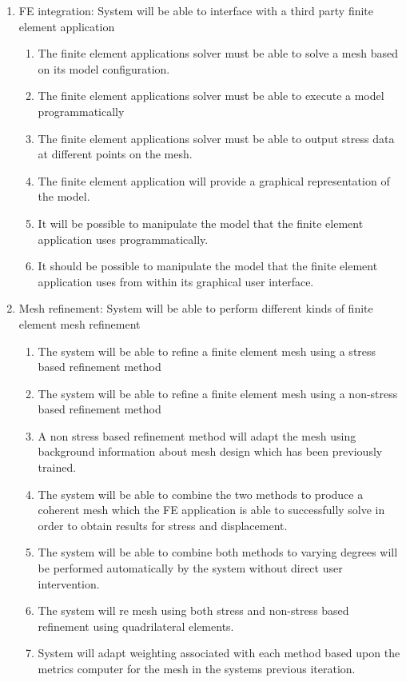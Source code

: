 \documentclass{article}
\begin{document}
\begin{enumerate}
\item FE integration: System will be able to interface with a third party finite element application

\begin{enumerate}
\item The finite element applications solver must be able to solve a mesh based on its model configuration.
\item The finite element applications solver must be able to execute a model programmatically
\item The finite element applications solver must be able to output stress data at different points on the mesh.
\item The finite element application will provide a graphical representation of the model.
\item It will be possible to manipulate the model that the finite element application uses programmatically.
\item It should be possible to manipulate the model that the finite element application uses from within its graphical user interface.
\end{enumerate}

\item Mesh refinement: System will be able to perform different kinds of finite element mesh refinement

\begin{enumerate}
\item The system will be able to refine a finite element mesh using a stress based refinement method
\item The system will be able to refine a finite element mesh using a non-stress based refinement method

\item A non stress based refinement method will adapt the mesh using background information about mesh design which has been previously trained.

\item The system will be able to combine the two methods to produce a coherent mesh which the FE application is able to successfully solve in order to obtain results for stress and displacement.
\item The system will be able to combine both methods to varying degrees will be performed automatically by the system without direct user intervention.
\item The system will re mesh using both stress and non-stress based refinement using quadrilateral elements.
\item System will adapt weighting associated with each method based upon the metrics computer for the mesh in the systems previous iteration.
\end{enumerate}


\end{enumerate}
\end{document}
